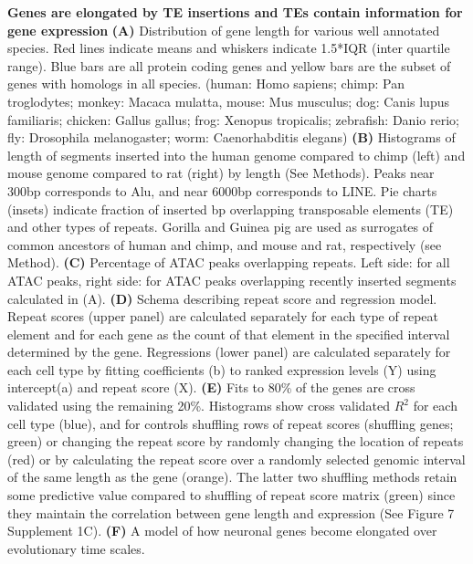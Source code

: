 \textbf{Genes are elongated by TE insertions and TEs contain information for gene expression}
\textbf{(A)} Distribution of gene length for various well annotated species. Red lines indicate means and whiskers indicate 1.5*IQR (inter quartile range). Blue bars are all protein coding genes and yellow bars are the subset of genes with homologs in all species. (human: Homo sapiens; chimp: Pan troglodytes; monkey: Macaca mulatta, mouse: Mus musculus; dog: Canis lupus familiaris; chicken: Gallus gallus; frog: Xenopus tropicalis; zebrafish: Danio rerio; fly: Drosophila melanogaster; worm: Caenorhabditis  elegans)
\textbf{(B)} Histograms of length of segments inserted into the human genome compared to chimp (left) and mouse genome compared to rat (right) by length (See Methods). Peaks near 300bp corresponds to Alu, and near 6000bp corresponds to LINE. Pie charts (insets) indicate fraction of inserted bp overlapping transposable elements (TE) and other types of repeats. Gorilla and Guinea pig are used as surrogates of common ancestors of human and chimp, and mouse and rat, respectively (see Method). 
\textbf{(C)} Percentage of ATAC peaks overlapping repeats. Left side: for all ATAC peaks, right side: for ATAC peaks overlapping recently inserted segments calculated in (A). 
\textbf{(D)} Schema describing repeat score and regression model. Repeat scores (upper panel) are calculated separately for each type of repeat element and for each gene as the count of that element in the specified interval determined by the gene. Regressions (lower panel) are calculated separately for each cell type by fitting coefficients (b) to ranked expression levels (Y) using intercept(a) and repeat score (X). 
\textbf{(E)} Fits to 80\% of the genes are cross validated using the remaining 20\%. Histograms show cross validated $R^2$ for each cell type (blue), and for controls shuffling rows of repeat scores (shuffling genes; green) or changing the repeat score by randomly changing the location of repeats (red) or by calculating the repeat score over a randomly selected genomic interval of the same length as the gene (orange). The latter two shuffling methods retain some predictive value compared to shuffling of repeat score matrix (green) since they maintain the correlation between gene length and expression (See Figure 7 Supplement 1C).
\textbf{(F)} A model of how neuronal genes become elongated over evolutionary time scales. 
